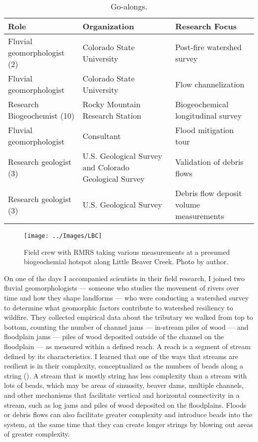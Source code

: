 \documentclass[
]{article}
\begin{document}
\captionsetup{width=6.5in}

\begin{table}[!h]
\centering\centering
\caption{\label{tab:IntroTable2}Go-alongs.}
\centering
\begin{tabu} to 
\toprule
Role & Organization & Research Focus\\
\midrule
Fluvial geomorphologist (2) & Colorado State University & Post-fire watershed survey\\
Fluvial geomorphologist & Colorado State University & Flow channelization\\
Research Biogeochemist (10) & Rocky Mountain Research Station & Biogeochemical longitudinal survey\\
Fluvial geomorphologist & Consultant & Flood mitigation tour\\
Research geologist (3) & U.S. Geological Survey and Colorado Geological Survey & Validation of debris flows\\
\addlinespace
Research geologist (3) & U.S. Geological Survey & Debris flow deposit volume measurements\\
\bottomrule
\end{tabu}
\end{table}

\begin{figure}
\texttt{[image: ../Images/LBC]} \caption[Little Beaver Creek survey]{Field crew with RMRS taking various measurements at a presumed biogeochemial hotspot along Little Beaver Creek. Photo by author.}\label{fig:figureTitle6}
\end{figure}

On one of the days I accompanied scientists in their field research, I joined two fluvial geomorphologists --- someone who studies the movement of rivers over time and how they shape landforms --- who were conducting a watershed survey to determine what geomorphic factors contribute to watershed resiliency to wildfire. They collected empirical data about the tributary we walked from top to bottom, counting the number of channel jams --- in-stream piles of wood --- and floodplain jams --- piles of wood deposited outside of the channel on the floodplain --- as measured within a defined reach. A reach is a segment of stream defined by its characteristics. I learned that one of the ways that streams are resilient is in their complexity, conceptualized as the numbers of beads along a string (). A stream that is mostly string has less complexity than a stream with lots of beads, which may be areas of sinuosity, beaver dams, multiple channels, and other mechanisms that facilitate vertical and horizontal connectivity in a stream, such as log jams and piles of wood deposited on the floodplains. Floods or debris flows can also facilitate greater complexity and introduce beads into the system, at the same time that they can create longer strings by blowing out areas of greater complexity.
\end{document}

